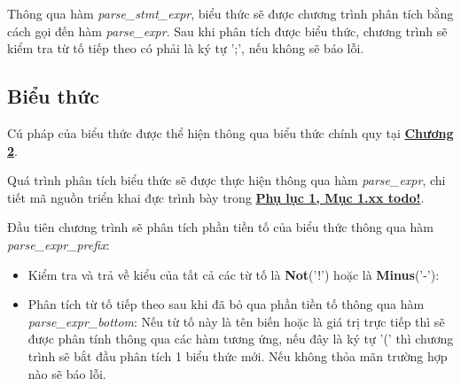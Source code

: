 Thông qua hàm \textit{parse\_stmt\_expr}, biểu thức sẽ được chương trình phân tích bằng cách gọi đến hàm \textit{parse\_expr}. Sau khi phân tích được biểu thức, chương trình sẽ kiểm tra từ tố tiếp theo có phải là ký tự ';', nếu không sẽ báo lỗi.

\subsection{Biểu thức}
Cú pháp của biểu thức được thể hiện thông qua biểu thức chính quy tại \hyperref[ch2:expr]{\bf Chương 2}.

Quá trình phân tích biểu thức sẽ được thực hiện thông qua hàm \textit{parse\_expr}, chi tiết mã nguồn triển khai đực trình bày trong \hyperref[ap1:simple_token]{\bf Phụ lục 1, Mục 1.xx todo!}.

Đầu tiên chương trình sẽ phân tích phần tiền tố của biểu thức thông qua hàm \\\textit{parse\_expr\_prefix}:
\begin{itemize}
    \item Kiểm tra và trả về kiểu của tất cả các từ tố là \textbf{Not}('!') hoặc là \textbf{Minus}('-'):
    \item Phân tích từ tố tiếp theo sau khi đã bỏ qua phần tiền tố thông qua hàm \textit{parse\_expr\_bottom}:
    Nếu từ tố này là tên biến hoặc là giá trị trực tiếp thì sẽ được phân tính thông qua các hàm tương ứng, nếu đây là ký tự '(' thì chương trình sẽ bắt đầu phân tích 1 biểu thức mới. Nếu không thỏa mãn trường hợp nào sẽ báo lỗi.
\end{itemize}
